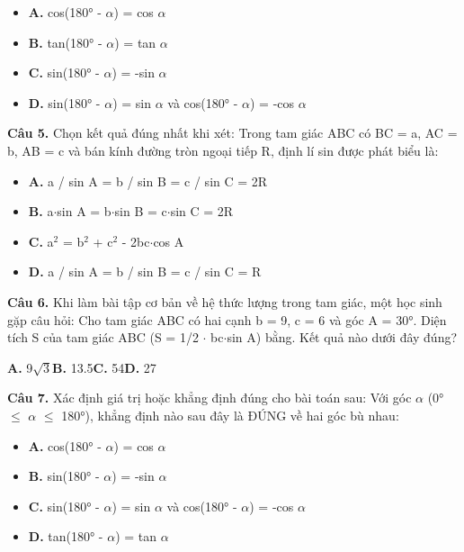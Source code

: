 \documentclass[11pt,a4paper]{article}
\begin{document}
\begin{itemize}\setlength{\itemsep}{1pt}\setlength{\parskip}{0pt}
  \item[] \textbf{A.} cos(180° - $\alpha$) = cos $\alpha$
  \item[] \textbf{B.} tan(180° - $\alpha$) = tan $\alpha$
  \item[] \textbf{C.} sin(180° - $\alpha$) = -sin $\alpha$
  \item[] \textbf{D.} sin(180° - $\alpha$) = sin $\alpha$ và cos(180° - $\alpha$) = -cos $\alpha$
\end{itemize}\vspace{2pt}
\textbf{\color{primary} Câu 5.} Chọn kết quả đúng nhất khi xét: Trong tam giác ABC có BC = a, AC = b, AB = c và bán kính đường tròn ngoại tiếp R, định lí sin được phát biểu là:\par
\begin{itemize}\setlength{\itemsep}{1pt}\setlength{\parskip}{0pt}
  \item[] \textbf{A.} a / sin A = b / sin B = c / sin C = 2R
  \item[] \textbf{B.} a$\cdot$sin A = b$\cdot$sin B = c$\cdot$sin C = 2R
  \item[] \textbf{C.} a$^2$ = b$^2$ + c$^2$ - 2bc$\cdot$cos A
  \item[] \textbf{D.} a / sin A = b / sin B = c / sin C = R
\end{itemize}\vspace{2pt}
\textbf{\color{primary} Câu 6.} Khi làm bài tập cơ bản về hệ thức lượng trong tam giác, một học sinh gặp câu hỏi: Cho tam giác ABC có hai cạnh b = 9, c = 6 và góc A = 30°. Diện tích S của tam giác ABC (S = 1/2 $\cdot$ bc$\cdot$sin A) bằng. Kết quả nào dưới đây đúng?\par
\hspace*{1.5em}\textbf{A.} 9$\sqrt{3}$\quad\quad \textbf{B.} 13.5\quad\quad \textbf{C.} 54\quad\quad \textbf{D.} 27\par\vspace{2pt}
\textbf{\color{primary} Câu 7.} Xác định giá trị hoặc khẳng định đúng cho bài toán sau: Với góc $\alpha$ (0° $\le$ $\alpha$ $\le$ 180°), khẳng định nào sau đây là ĐÚNG về hai góc bù nhau:\par
\begin{itemize}\setlength{\itemsep}{1pt}\setlength{\parskip}{0pt}
  \item[] \textbf{A.} cos(180° - $\alpha$) = cos $\alpha$
  \item[] \textbf{B.} sin(180° - $\alpha$) = -sin $\alpha$
  \item[] \textbf{C.} sin(180° - $\alpha$) = sin $\alpha$ và cos(180° - $\alpha$) = -cos $\alpha$
  \item[] \textbf{D.} tan(180° - $\alpha$) = tan $\alpha$
\end{itemize}\vspace{2pt}
\end{document}
